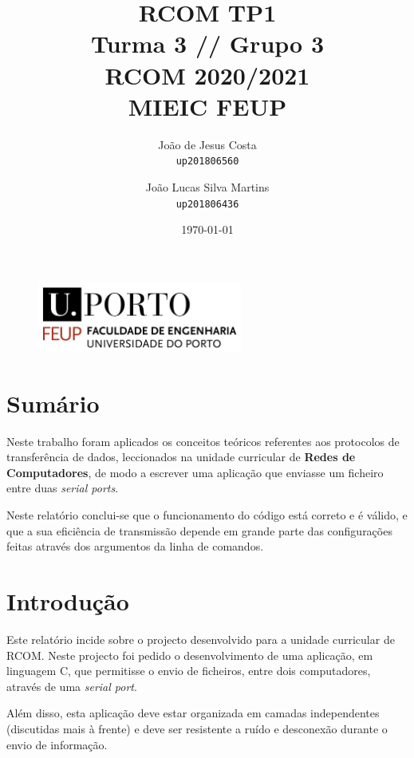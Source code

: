 \documentclass[11pt]{report}
\begin{document}
\title{\huge{\textbf{RCOM TP1}} \\ Turma 3 // Grupo 3 \\ RCOM 2020/2021 \\ MIEIC FEUP}
\author{João de Jesus Costa \\ \texttt{up201806560} \and
	João Lucas Silva Martins \\ \texttt{up201806436}}
\date{\today{}}

\begin{figure}[b]
	\centering
	\includegraphics[width=0.6\textwidth]{feup_logo.png}
\end{figure}
\maketitle{}

\tableofcontents{}
\newpage

\chapter{Sumário}

Neste trabalho foram aplicados os conceitos teóricos referentes aos protocolos
de transferência de dados, leccionados na unidade curricular de
\textbf{Redes de Computadores}, de modo a escrever uma aplicação que enviasse
um ficheiro entre duas \textit{serial ports}.

Neste relatório conclui-se que o funcionamento do código está correto e é
válido, e que a sua eficiência de transmissão depende em grande parte das
configurações feitas através dos argumentos da linha de comandos.

{\let\clearpage\relax \chapter{Introdução}}

Este relatório incide sobre o projecto desenvolvido para a unidade curricular
de RCOM. Neste projecto foi pedido o desenvolvimento de uma aplicação, em
linguagem C, que permitisse o envio de ficheiros, entre dois computadores,
através de uma \textit{serial port}.

Além disso, esta aplicação deve estar organizada em camadas independentes
(discutidas mais à frente) e deve ser resistente a ruído e desconexão durante
o envio de informação.
\end{document}
